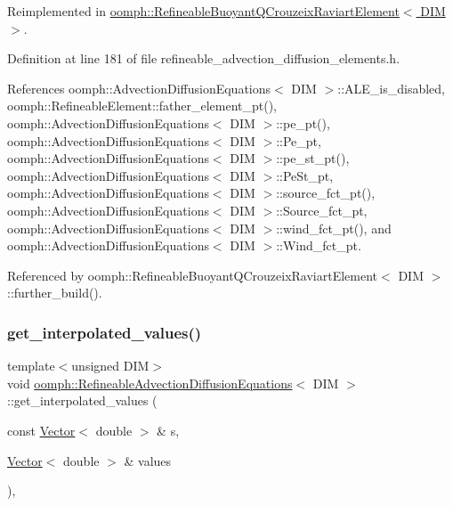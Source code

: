 Reimplemented in \hyperlink{classoomph_1_1RefineableBuoyantQCrouzeixRaviartElement_a60d622f02595901b5f3ad830de915471}{oomph\+::\+Refineable\+Buoyant\+Q\+Crouzeix\+Raviart\+Element$<$ D\+I\+M $>$}.



Definition at line 181 of file refineable\+\_\+advection\+\_\+diffusion\+\_\+elements.\+h.



References oomph\+::\+Advection\+Diffusion\+Equations$<$ D\+I\+M $>$\+::\+A\+L\+E\+\_\+is\+\_\+disabled, oomph\+::\+Refineable\+Element\+::father\+\_\+element\+\_\+pt(), oomph\+::\+Advection\+Diffusion\+Equations$<$ D\+I\+M $>$\+::pe\+\_\+pt(), oomph\+::\+Advection\+Diffusion\+Equations$<$ D\+I\+M $>$\+::\+Pe\+\_\+pt, oomph\+::\+Advection\+Diffusion\+Equations$<$ D\+I\+M $>$\+::pe\+\_\+st\+\_\+pt(), oomph\+::\+Advection\+Diffusion\+Equations$<$ D\+I\+M $>$\+::\+Pe\+St\+\_\+pt, oomph\+::\+Advection\+Diffusion\+Equations$<$ D\+I\+M $>$\+::source\+\_\+fct\+\_\+pt(), oomph\+::\+Advection\+Diffusion\+Equations$<$ D\+I\+M $>$\+::\+Source\+\_\+fct\+\_\+pt, oomph\+::\+Advection\+Diffusion\+Equations$<$ D\+I\+M $>$\+::wind\+\_\+fct\+\_\+pt(), and oomph\+::\+Advection\+Diffusion\+Equations$<$ D\+I\+M $>$\+::\+Wind\+\_\+fct\+\_\+pt.



Referenced by oomph\+::\+Refineable\+Buoyant\+Q\+Crouzeix\+Raviart\+Element$<$ D\+I\+M $>$\+::further\+\_\+build().

\mbox{\label{classoomph_1_1RefineableAdvectionDiffusionEquations_af9dd36503e3196a7f640dbcebb22551d}} 
\subsubsection{\texorpdfstring{get\+\_\+interpolated\+\_\+values()}{get\_interpolated\_values()}\hspace{0.1cm}{\footnotesize\ttfamily [1/2]}}
{\footnotesize\ttfamily template$<$unsigned D\+IM$>$ \\
void \hyperlink{classoomph_1_1RefineableAdvectionDiffusionEquations}{oomph\+::\+Refineable\+Advection\+Diffusion\+Equations}$<$ D\+IM $>$\+::get\+\_\+interpolated\+\_\+values (\begin{DoxyParamCaption}\item[{const \hyperlink{classoomph_1_1Vector}{Vector}$<$ double $>$ \&}]{s,  }\item[{\hyperlink{classoomph_1_1Vector}{Vector}$<$ double $>$ \&}]{values }\end{DoxyParamCaption})\hspace{0.3cm}{\ttfamily [inline]}, {\ttfamily [virtual]}}



